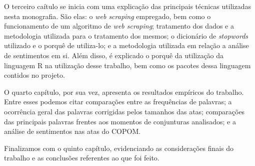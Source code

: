 O terceiro caítulo se inicia com uma explicação das principais técnicas utilizadas nesta monografia. São elas: o \textit{web scraping} empregado, bem como o funcionamento de um algoritmo de \textit{web scraping}; tratamento dos dados e a metodologia utilizada para o tratamento dos mesmos; o dicionário de \textit{stopwords} utilizado e o porquê de utiliza-lo; e a metodologia utilizada em relação a análise de sentimentos em si. Além disso, é explicado o porquê da utilização da linguagem R na utilização desse trabalho, bem como os pacotes dessa linguagem contidos no projeto. %

O quarto capítulo, por sua vez, apresenta os resultados empíricos do trabalho. Entre esses podemos citar comparações entre as frequências de palavras; a ocorrência geral das palavras corrigidas pelos tamanhos das atas; comparações das principais palavras frentes aos momentos de conjunturas analisados; e a análise de sentimentos nas atas do COPOM.

Finalizamos com o quinto capítulo, evidenciando as considerações finais do trabalho e as conclusões referentes ao que foi feito.

